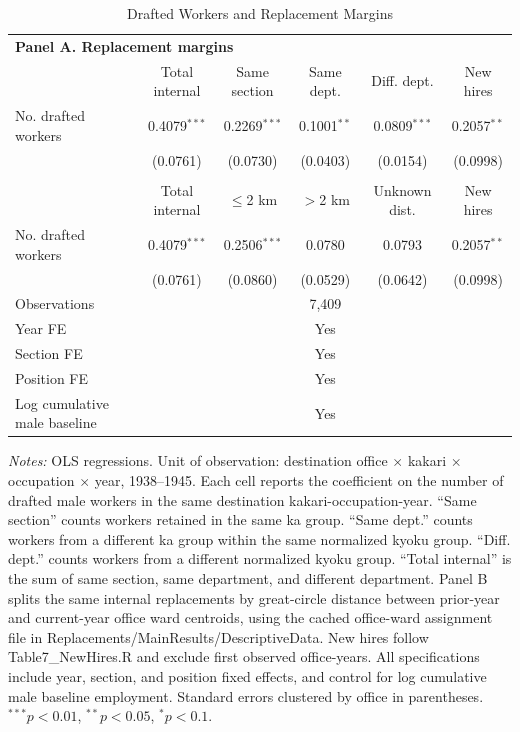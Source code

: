 \begin{table}[!htbp]\centering
\caption{Drafted Workers and Replacement Margins}
\label{tab:bydistance-draft-kakari}
\small
\begin{threeparttable}
\begin{tabular}{lccccc}
\toprule
\multicolumn{6}{l}{\textbf{Panel A. Replacement margins}} \\
 & Total internal & Same section & Same dept. & Diff. dept. & New hires \\
\midrule
No. drafted workers & 0.4079$^{***}$ & 0.2269$^{***}$ & 0.1001$^{**}$ & 0.0809$^{***}$ & 0.2057$^{**}$ \\
 & (0.0761) & (0.0730) & (0.0403) & (0.0154) & (0.0998) \\
\addlinespace
\multicolumn{6}{l}{\textbf{Panel B. Geographic benchmark for internal replacements}} \\
 & Total internal & $\leq$2 km & $>$2 km & Unknown dist. & New hires \\
\midrule
No. drafted workers & 0.4079$^{***}$ & 0.2506$^{***}$ & 0.0780 & 0.0793 & 0.2057$^{**}$ \\
 & (0.0761) & (0.0860) & (0.0529) & (0.0642) & (0.0998) \\
\midrule
Observations & \multicolumn{5}{c}{7,409} \\
Year FE & \multicolumn{5}{c}{Yes} \\
Section FE & \multicolumn{5}{c}{Yes} \\
Position FE & \multicolumn{5}{c}{Yes} \\
Log cumulative male baseline & \multicolumn{5}{c}{Yes} \\
\bottomrule
\end{tabular}
\begin{tablenotes}[flushleft]
\footnotesize
\item \textit{Notes:} OLS regressions. Unit of observation: destination office $\times$ kakari $\times$ occupation $\times$ year, 1938--1945. Each cell reports the coefficient on the number of drafted male workers in the same destination kakari-occupation-year. ``Same section'' counts workers retained in the same ka group. ``Same dept.'' counts workers from a different ka group within the same normalized kyoku group. ``Diff. dept.'' counts workers from a different normalized kyoku group. ``Total internal'' is the sum of same section, same department, and different department. Panel B splits the same internal replacements by great-circle distance between prior-year and current-year office ward centroids, using the cached office-ward assignment file in Replacements/MainResults/DescriptiveData. New hires follow Table7\_NewHires.R and exclude first observed office-years. All specifications include year, section, and position fixed effects, and control for log cumulative male baseline employment. Standard errors clustered by office in parentheses. $^{***}p<0.01$, $^{**}p<0.05$, $^{*}p<0.1$.
\end{tablenotes}
\end{threeparttable}
\end{table}
